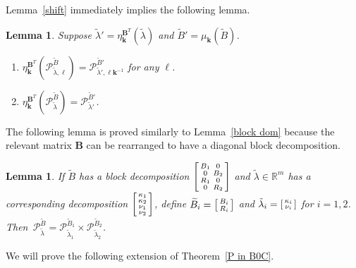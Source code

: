 \documentclass[10pt]{article}
\newtheorem{lemma}[proposition]{Lemma}
\theoremstyle{definition}
\theoremstyle{remark}
\numberwithin{equation}{section}
\newcommand{\reals}{\mathbb R}
\newcommand{\0}{{\mathbf{0}}}
\newcommand{\kk}{{\boldsymbol{k}}}
\renewcommand{\ll}{{\boldsymbol\ell}}
\newcommand{\tB}{{\widetilde{B}}}
\newcommand{\BB}{\mathbf{B}}
\newcommand{\R}{\mathcal{R}}
\renewcommand{\P}{\mathcal{P}}
\begin{document}
Lemma~\ref{shift} immediately implies the following lemma.
\begin{lemma}\label{shift extended}
Suppose $\tilde\lambda'=\eta_\kk^{\BB^T}(\tilde\lambda)$ and $\tB'=\mu_\kk(\tB)$.
\begin{enumerate}[label=\bf\arabic*., ref=\arabic*]
\item \label{shift extended one}
$\eta^{\BB^T}_\kk\!\!(\P^\tB_{\tilde\lambda,\ll})=\P^{\tB'}_{\tilde\lambda',\ll\kk^{-1}}$ for any $\ll$.
\item \label{shift extended all}
  $\eta^{\BB^T}_\kk\!\!(\P^\tB_{\tilde\lambda})=\P^{\tB'}_{\tilde\lambda'}$.
\end{enumerate}
\end{lemma}

The following lemma is proved similarly to Lemma~\ref{block dom} because the relevant matrix $\BB$ can be rearranged to have a diagonal block decomposition.

\begin{lemma}\label{block dom ext}
If $\tB$ has a block decomposition $\begin{bsmallmatrix}B_1&0\\0&B_2\\R_1&0\\0&R_2\end{bsmallmatrix}$ and $\tilde\lambda\in\reals^m$ has a corresponding decomposition $\begin{bsmallmatrix}\kappa_1\\\kappa_2\\\nu_1\\\nu_2\end{bsmallmatrix}$, define $\tB_i=\begin{bsmallmatrix}B_i\\R_i\end{bsmallmatrix}$ and $\tilde\lambda_i=\begin{bsmallmatrix}\kappa_i\\\nu_i\end{bsmallmatrix}$ for $i=1,2$.
  Then~$\P_{\tilde\lambda}^\tB=\P_{\tilde\lambda_1}^{\tB_1}\times\P_{\tilde\lambda_2}^{\tB_2}$.
\end{lemma}

We will prove the following extension of Theorem~\ref{P in B0C}.
\end{document}
